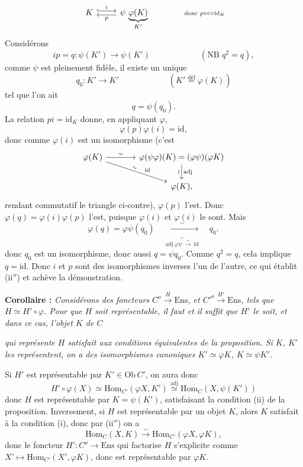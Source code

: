\documentclass[11pt]{article}
\newcommand{\printedpage}[1]{\marginpar{\footnotesize p.~#1}}
\newcommand{\msp}[1]{\marginpar{\footnotesize [#1]}}
\newcommand{\Hom}{\mathrm{Hom}}
\newcommand{\Ob}{\mathrm{Ob}\,}
\newcommand{\id}{\mathrm{id}}
\newcommand{\Ens}{\mathrm{Ens}}
\begin{document}
\[
\begin{tikzcd}
K \arrow[r,hook,shift left,"i"] & \psi\,\underbrace{\varphi(K)}_{K'} \arrow[l,shift left,"p"]
\end{tikzcd}
\qquad\qquad {\scriptstyle \text{donc } p\circ i = \id_K}
\]
Considérons
\[
ip = q : \psi(K') \longrightarrow \psi(K') \qquad\qquad\qquad (\text{NB } q^2 = q),
\]
comme $\psi$ est pleinement fidèle, il existe un unique
\[
q_0 : K' \longrightarrow K' \qquad\qquad\qquad (K' \overset{\text{déf}}{=} \varphi(K))
\]
tel que l'on ait
\[
q = \psi(q_0).
\]
La relation $pi = \id_K$ donne, en appliquant $\varphi$,
\[
\varphi(p)\varphi(i) = \id,
\]
donc comme $\varphi(i)$ est un isomorphisme (c'est
\[
\begin{tikzcd}[column sep=large]
\varphi(K) \arrow[r,"\sim"] \arrow[dr,"\sim"{sloped,pos=0.45},"\id"{pos=0.6}] & \varphi(\psi\varphi)(K) = (\varphi\psi)(\varphi K) \arrow[d,"\wr"',"\mathrm{adj}"] \\
 & \varphi(K),
\end{tikzcd}
\]
rendant commutatif le triangle ci-contre), $\varphi(p)$ l'est. Donc $\varphi(q) = \varphi(i)\varphi(p)$ l'est, puisque $\varphi(i)$ et $\varphi(i)$ le sont. Mais
\[
\varphi(q) = \varphi\psi(q_0) \quad \underbrace{\xrightarrow{\ \sim\ }}_{\mathrm{adj}\ \varphi\psi\ \xrightarrow{\sim}\ \id} \quad q_0,
\]
donc $q_0$ est un isomorphisme, donc aussi $q = \psi q_0$. Comme $q^2 = q$, cela implique $q = \id$. Donc $i$ et $p$ sont des isomorphismes inverses l'un de l'autre, ce qui établit (ii$''$) et achève la démonstration.

\textbf{Corollaire :} \textit{Considérons des foncteurs $C^o \xrightarrow{H} \Ens$, et $C'^o \xrightarrow{H'} \Ens$, tels que $H \simeq H'\circ\varphi$. Pour que $H$ soit représentable, il faut et il suffit que $H'$ le soit, et dans ce cas, l'objet $K$ de $C$}

\noindent\msp{page 40}%
\textit{qui représente $H$ satisfait aux conditions équivalentes de la proposition. Si $K$, $K'$ les représentent, on a des isomorphismes canoniques $K' \simeq \varphi K$, $K \simeq \psi K'$.}

Si $H'$ est représentable par $K' \in \Ob C'$, on aura donc
\[
H'\circ\varphi(X) \simeq \Hom_{C'}(\varphi X,K') \overset{\mathrm{adj}}{\simeq} \Hom_C(X,\psi(K'))
\]
\printedpage{26}
donc $H$ est représentable par $K = \psi(K')$, satisfaisant la condition (ii) de la proposition. Inversement, si $H$ est représentable par un objet $K$, alors $K$ satisfait à la condition (i), donc par (ii$''$) on a
\[
\Hom_C(X,K) \xrightarrow{\sim} \Hom_{C'}(\varphi X,\varphi K),
\]
donc le foncteur $H' : C^o \longrightarrow \Ens$ qui factorise $H$ s'explicite comme $X' \longmapsto \Hom_{C'}(X',\varphi K)$, donc est représentable par $\varphi K$. %
\end{document}
